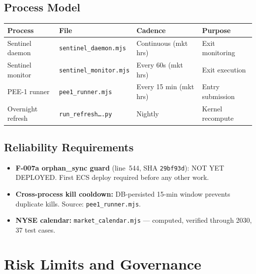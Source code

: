 \documentclass[11pt,a4paper]{article}
\newcommand{\sha}[1]{\texttt{\footnotesize#1}}
\begin{document}
\subsection{Process Model}

\begin{center}
\begin{tabular}{llll}
\toprule
\textbf{Process} & \textbf{File} & \textbf{Cadence} & \textbf{Purpose}\\
\midrule
Sentinel daemon  & \texttt{sentinel\_daemon.mjs}  & Continuous (mkt hrs) & Exit monitoring\\
Sentinel monitor & \texttt{sentinel\_monitor.mjs} & Every 60s (mkt hrs)  & Exit execution\\
PEE-1 runner     & \texttt{pee1\_runner.mjs}       & Every 15 min (mkt hrs) & Entry submission\\
Overnight refresh & \texttt{run\_refresh\ldots.py} & Nightly & Kernel recompute\\
\bottomrule
\end{tabular}
\end{center}

\subsection{Reliability Requirements}

\begin{itemize}
  \item \textbf{F-007a orphan\_sync guard} (line~544, SHA \sha{29bf93d}): NOT YET DEPLOYED. First ECS deploy required before any other work.
  \item \textbf{Cross-process kill cooldown:} DB-persisted 15-min window prevents duplicate kills. Source: \texttt{pee1\_runner.mjs}.
  \item \textbf{NYSE calendar:} \texttt{market\_calendar.mjs} — computed, verified through 2030, 37 test cases.
\end{itemize}

\section{Risk Limits and Governance}
\end{document}
